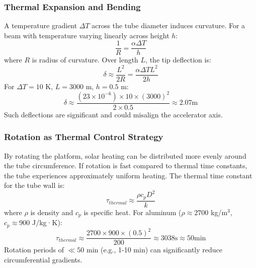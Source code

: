 {{{{\subsubsection{Thermal Expansion and Bending}
A temperature gradient $\Delta T$ across the tube diameter induces curvature. For a beam with temperature varying linearly across height $h$:
\begin{equation}
\frac{1}{R} = \frac{\alpha \Delta T}{h}
\end{equation}
where $R$ is radius of curvature. Over length $L$, the tip deflection is:
\begin{equation}
\delta \approx \frac{L^2}{2R} = \frac{\alpha \Delta T L^2}{2h}
\end{equation}
For $\Delta T = 10$ K, $L = 3000$ m, $h = 0.5$ m:
\begin{equation}
\delta \approx \frac{(23 \times 10^{-6}) \times 10 \times (3000)^2}{2 \times 0.5} \approx 2.07  \text{m}
\end{equation}
Such deflections are significant and could misalign the accelerator axis.

\subsubsection{Rotation as Thermal Control Strategy}
By rotating the platform, solar heating can be distributed more evenly around the tube circumference. If rotation is fast compared to thermal time constants, the tube experiences approximately uniform heating. The thermal time constant for the tube wall is:
\begin{equation}
\tau_{thermal} \approx \frac{\rho c_p D^2}{k}
\end{equation}
where $\rho$ is density and $c_p$ is specific heat. For aluminum ($\rho \approx 2700$ kg/m$^3$, $c_p \approx 900$ J/kg·K):
\begin{equation}
\tau_{thermal} \approx \frac{2700 \times 900 \times (0.5)^2}{200} \approx 3038  \text{s} \approx 50  \text{min}
\end{equation}
Rotation periods of $\ll 50$ min (e.g., 1-10 min) can significantly reduce circumferential gradients.

}}}}
